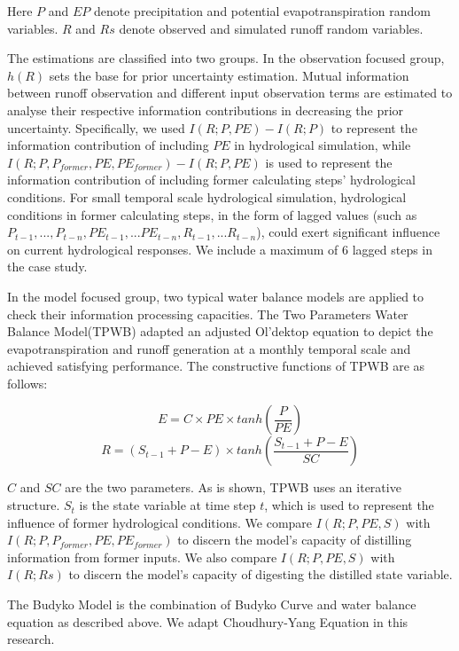 \documentclass[review]{elsarticle}
\begin{document}
Here $P$ and $EP$ denote precipitation and potential evapotranspiration random variables. $R$ and $Rs$ denote observed and simulated runoff random variables. 

The estimations are classified into two groups. In the observation focused group, $h(R)$ sets the base for prior uncertainty estimation. Mutual information between runoff observation and different input observation terms are estimated to analyse their respective information contributions in decreasing the prior uncertainty. Specifically, we used $I(R;P,PE)-I(R;P)$ to represent the information contribution of including $PE$ in hydrological simulation, while $I(R;P,P_{former},PE,PE_{former})-I(R;P,PE)$ is used to represent the information contribution of including  former calculating steps' hydrological conditions. For small temporal scale hydrological simulation, hydrological conditions in former calculating steps, in the form of lagged values (such as $P_{t-1},...,P_{t-n},PE_{t-1},...PE_{t-n},R_{t-1},...R_{t-n}$), could exert significant influence on current hydrological responses. We include a maximum of 6 lagged steps in the case study.     

In the model focused group, two typical water balance models are applied to check their information processing capacities. The Two Parameters Water Balance Model(TPWB)\citep{xiong1999two} adapted an adjusted Ol'dektop equation\citep{jobson1982evaporation} to depict the evapotranspiration and runoff generation at a monthly temporal scale and achieved satisfying performance. The constructive functions of TPWB are as follows:

 \begin{equation}
E=C\times PE \times tanh(\frac{P}{PE})
 \end{equation}
 \begin{equation}
R=(S_{t-1}+P-E)\times tanh(\frac{S_{t-1}+P-E}{SC})
 \end{equation}
 
$C$ and $SC$ are the two parameters. As is shown, TPWB uses an iterative structure. $S_t$ is the state variable at time step $t$, which is used to  represent the influence of former hydrological conditions. We compare $I(R;P,PE,S)$ with $I(R;P,P_{former},PE,PE_{former})$ to discern the model's capacity of distilling information from former inputs. We also compare $I(R;P,PE,S)$ with $I(R;Rs)$ to discern the model's capacity of digesting the distilled state variable.

 The Budyko Model is the combination of Budyko Curve and water balance equation as described above. We adapt Choudhury-Yang Equation in this research.  
\end{document}

